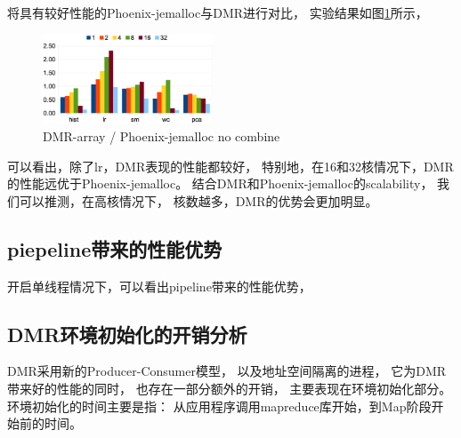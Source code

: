 将具有较好性能的Phoenix-jemalloc与DMR进行对比，
实验结果如图\ref{dmr:time_jemalloc}所示，
\begin{figure}[!h!t]  
    \centering
    \includegraphics[width=0.45\textwidth]{img/dmr_time_jemalloc.eps}
    \caption{DMR-array / Phoenix-jemalloc no combine}
    \label{dmr:time_jemalloc}
\end{figure}
可以看出，除了lr，DMR表现的性能都较好，
特别地，在16和32核情况下，DMR的性能远优于Phoenix-jemalloc。
结合DMR和Phoenix-jemalloc的scalability，
我们可以推测，在高核情况下，
核数越多，DMR的优势会更加明显。


\subsection{piepeline带来的性能优势}
开启单线程情况下，可以看出pipeline带来的性能优势，


\subsection{DMR环境初始化的开销分析}
DMR采用新的Producer-Consumer模型，
以及地址空间隔离的进程，
它为DMR带来好的性能的同时，
也存在一部分额外的开销，
主要表现在环境初始化部分。
环境初始化的时间主要是指：
从应用程序调用mapreduce库开始，到Map阶段开始前的时间。

